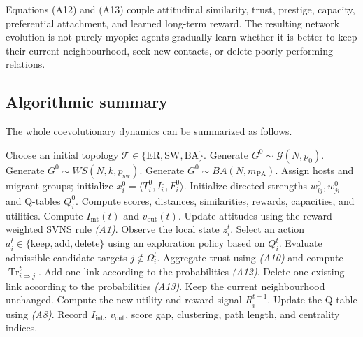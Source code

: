\documentclass[11pt,a4paper]{article}
\begin{document}
Equations (A12) and (A13) couple attitudinal similarity, trust, prestige,
capacity, preferential attachment, and learned long-term reward. The resulting
network evolution is not purely myopic: agents gradually learn whether it is better
to keep their current neighbourhood, seek new contacts, or delete poorly performing
relations.

\subsection{Algorithmic summary}

The whole coevolutionary dynamics can be summarized as follows.

\begin{algorithm}[H]
	\caption{Advanced SVNS immigration model with topology, trust, and learning}
	\begin{algorithmic}[1]
		\State Choose an initial topology $\mathcal T\in\{\mathrm{ER},\mathrm{SW},\mathrm{BA}\}$.
		\State Generate $G^0\sim\mathcal G(N,p_0)$.
		\State Generate $G^0\sim WS(N,k,p_{\mathrm{sw}})$.
		\Else
		\State Generate $G^0\sim BA(N,m_{\mathrm{PA}})$.
		\EndIf
		\State Assign hosts and migrant groups; initialize $x_i^0=\langle T_i^0,I_i^0,F_i^0\rangle$.
		\State Initialize directed strengths $w_{ij}^0,w_{ji}^0$ and Q-tables $Q_i^0$.
		\State Compute scores, distances, similarities, rewards, capacities, and utilities.
		\State Compute $I_{\mathrm{int}}(t)$ and $v_{\mathrm{out}}(t)$.
		\State Update attitudes using the reward-weighted SVNS rule \emph{(A1)}.
		\State Observe the local state $z_i^t$.
		\State Select an action $a_i^t\in\{\mathrm{keep},\mathrm{add},\mathrm{delete}\}$ using an exploration policy based on $Q_i^t$.
		\State Evaluate admissible candidate targets $j\notin\Omega_i^t$.
		\State Aggregate trust using \emph{(A10)} and compute $\operatorname{Tr}_{i\Rightarrow j}^t$.
		\State Add one link according to the probabilities \emph{(A12)}.
		\State Delete one existing link according to the probabilities \emph{(A13)}.
		\Else
		\State Keep the current neighbourhood unchanged.
		\EndIf
		\State Compute the new utility and reward signal $R_i^{t+1}$.
		\State Update the Q-table using \emph{(A8)}.
		\EndFor
		\State Record $I_{\mathrm{int}}$, $v_{\mathrm{out}}$, score gap, clustering, path length, and centrality indices.
		\EndFor
	\end{algorithmic}
\end{algorithm}
\end{document}
